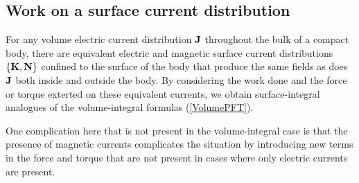 \subsection*{Work on a surface current distribution}

For any volume electric current distribution $\mathbf{J}$ throughout
the bulk of a compact body, there are equivalent electric and 
magnetic surface current distributions $\{\mathbf{K}, \mathbf{N}\}$ confined
to the surface of the body that produce the same fields as does
$\mathbf{J}$ both inside and outside the body. By considering
the work done and the force or torque exterted on these 
equivalent currents, we obtain surface-integral analogues 
of the volume-integral formulas (\ref{VolumePFT}). 

One complication here that is not present in the volume-integral
case is that the presence of magnetic currents complicates the
situation by introducing new terms in the force and torque that 
are not present in cases where only electric currents are present.


